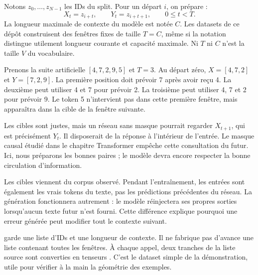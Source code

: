 Notons \(z_0,\ldots,z_{N-1}\) les IDs du split.
Pour un départ \(i\), on prépare :
\[
    X_t=z_{i+t},\qquad Y_t=z_{i+t+1},
    \qquad 0\leq t<T.
\]
La longueur maximale de contexte du modèle est notée \(C\).
Les datasets de ce dépôt construisent des fenêtres fixes de taille \(T=C\),
même si la notation distingue utilement longueur courante et capacité maximale.
Ni \(T\) ni \(C\) n'est la taille \(V\) du vocabulaire.

Prenons la suite artificielle \([4,7,2,9,5]\) et \(T=3\).
Au départ zéro, \(X=[4,7,2]\) et \(Y=[7,2,9]\).
La première position doit prévoir 7 après avoir reçu 4.
La deuxième peut utiliser 4 et 7 pour prévoir 2.
La troisième peut utiliser 4, 7 et 2 pour prévoir 9.
Le token 5 n'intervient pas dans cette première fenêtre, mais apparaîtra
dans la cible de la fenêtre suivante.

Les cibles sont justes, mais un réseau sans masque pourrait regarder
\(X_{t+1}\), qui est précisément \(Y_t\). Il disposerait de la réponse
à l'intérieur de l'entrée. Le masque causal étudié dans le chapitre Transformer
empêche cette consultation du futur. Ici, nous préparons les bonnes paires ;
le modèle devra encore respecter la bonne circulation d'information.

Les cibles viennent du corpus observé. Pendant l'entraînement, les entrées
sont également les vrais tokens du texte, pas les prédictions précédentes
du réseau. La génération fonctionnera autrement : le modèle réinjectera
ses propres sorties lorsqu'aucun texte futur n'est fourni.
Cette différence explique pourquoi une erreur générée peut modifier
tout le contexte suivant.


 garde une liste d'IDs et une longueur de contexte.
Il ne fabrique pas d'avance une liste contenant toutes les fenêtres.
À chaque appel, deux tranches de la liste source sont converties en tenseurs
. C'est le dataset simple de la démonstration,
utile pour vérifier à la main la géométrie des exemples.

